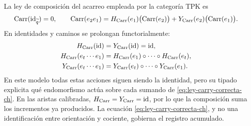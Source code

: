 La ley de composición del acarreo empleada por la categoría TPK es
\begin{equation}
 \operatorname{Carr}(\operatorname{id}_{\widetilde q})=0,\qquad
 \operatorname{Carr}(e_2e_1)
 =H_{\rm Carr}(e_1)\bigl(\operatorname{Carr}(e_2)\bigr)
  +Y_{\rm Carr}(e_2)\bigl(\operatorname{Carr}(e_1)\bigr).
 \label{eq:ley-carry-correcta-ch}
\end{equation}
En identidades y caminos se prolongan functorialmente:
\[
\begin{aligned}
 H_{\rm Carr}(\operatorname{id})
   &=Y_{\rm Carr}(\operatorname{id})=\operatorname{id},\\
 H_{\rm Carr}(e_t\cdots e_1)
   &=H_{\rm Carr}(e_1)\circ\cdots\circ H_{\rm Carr}(e_t),\\
 Y_{\rm Carr}(e_t\cdots e_1)
   &=Y_{\rm Carr}(e_t)\circ\cdots\circ Y_{\rm Carr}(e_1).
\end{aligned}
\]
En este modelo todas estas acciones siguen siendo la identidad, pero
su tipado explicita qué endomorfismo actúa sobre cada sumando de
\eqref{eq:ley-carry-correcta-ch}.
En las aristas calibradas, \(H_{\rm Carr}=Y_{\rm Carr}=\operatorname{id}\),
por lo que la composición suma los incrementos ya producidos. La ecuación
\eqref{eq:ley-carry-correcta-ch}, y no una identificación entre orientación y
cociente, gobierna el registro acumulado.

